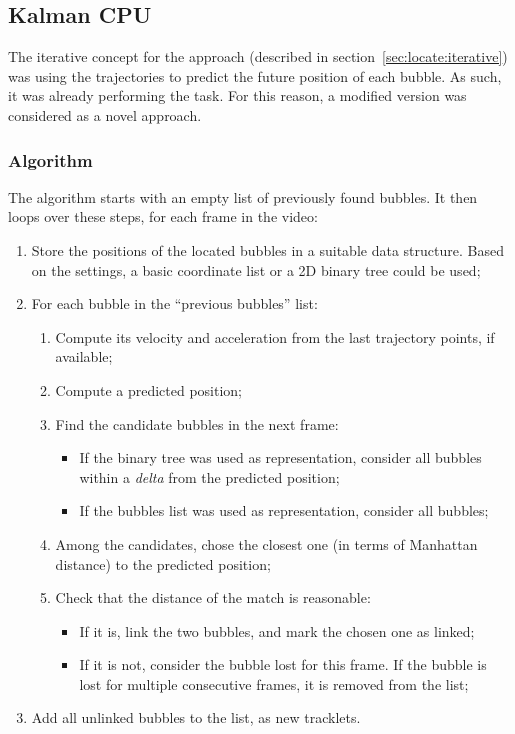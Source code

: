 \subsection{Kalman CPU}
\label{sec:link2d:kalman-cpu}

The iterative concept for the \locate* approach (described in section~\ref{sec:locate:iterative}) was using the trajectories to predict the future position of each bubble.
As such, it was already performing the \linkDD* task.
For this reason, a modified version was considered as a novel \linkDD* approach.

\subsubsection{Algorithm}

The algorithm starts with an empty list of previously found bubbles.
It then loops over these steps, for each frame in the video:
\begin{enumerate}
	\itemsep 0em
	\item Store the positions of the located bubbles in a suitable data structure. Based on the settings, a basic coordinate list or a 2D binary tree could be used;
	\item For each bubble in the ``previous bubbles'' list:
	      \begin{enumerate}
		      \item Compute its velocity and acceleration from the last trajectory points, if available;
		      \item Compute a predicted position;
		      \item Find the candidate bubbles in the next frame:
		            \begin{itemize}
			            \item If the binary tree was used as representation, consider all bubbles within a \textit{delta} from the predicted position;
			            \item If the bubbles list was used as representation, consider all bubbles;
		            \end{itemize}
		      \item Among the candidates, chose the closest one (in terms of Manhattan distance) to the predicted position;
		      \item Check that the distance of the match is reasonable:
		            \begin{itemize}
			            \item If it is, link the two bubbles, and mark the chosen one as linked;
			            \item If it is not, consider the bubble lost for this frame. If the bubble is lost for multiple consecutive frames, it is removed from the list;
		            \end{itemize}
	      \end{enumerate}
	\item Add all unlinked bubbles to the list, as new tracklets.
\end{enumerate}

